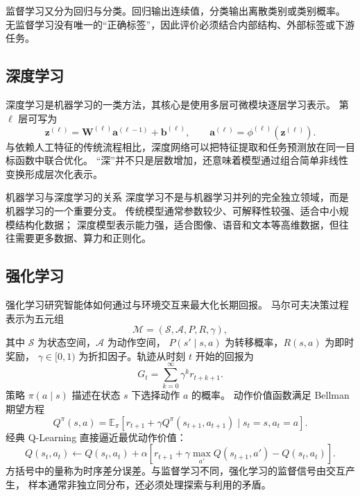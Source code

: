 \documentclass[UTF8,zihao=-4,a4paper,fontset=windows]{ctexart}
\newcommand{\E}{\mathbb{E}}
\begin{document}
监督学习又分为回归与分类。回归输出连续值，分类输出离散类别或类别概率。
无监督学习没有唯一的“正确标签”，因此评价必须结合内部结构、外部标签或下游任务。

\subsection{深度学习}

深度学习是机器学习的一类方法，其核心是使用多层可微模块逐层学习表示\cite{goodfellow}。
第 $\ell$ 层可写为
\begin{equation}
  \bm{z}^{(\ell)}
  =\bm{W}^{(\ell)}\bm{a}^{(\ell-1)}+\bm{b}^{(\ell)},
  \qquad
  \bm{a}^{(\ell)}=\phi^{(\ell)}\!\left(\bm{z}^{(\ell)}\right).
  \label{eq:layer}
\end{equation}
与依赖人工特征的传统流程相比，深度网络可以把特征提取和任务预测放在同一目标函数中联合优化。
“深”并不只是层数增加，还意味着模型通过组合简单非线性变换形成层次化表示。

\begin{notebox}{机器学习与深度学习的关系}
深度学习不是与机器学习并列的完全独立领域，而是机器学习的一个重要分支。
传统模型通常参数较少、可解释性较强、适合中小规模结构化数据；
深度模型表示能力强，适合图像、语音和文本等高维数据，但往往需要更多数据、算力和正则化。
\end{notebox}

\subsection{强化学习}

强化学习研究智能体如何通过与环境交互来最大化长期回报\cite{sutton}。
马尔可夫决策过程表示为五元组
\begin{equation}
  \mathcal{M}=(\mathcal{S},\mathcal{A},P,R,\gamma),
\end{equation}
其中 $\mathcal{S}$ 为状态空间，$\mathcal{A}$ 为动作空间，
$P(s'\mid s,a)$ 为转移概率，$R(s,a)$ 为即时奖励，
$\gamma\in[0,1)$ 为折扣因子。轨迹从时刻 $t$ 开始的回报为
\begin{equation}
  G_t=\sum_{k=0}^{\infty}\gamma^k r_{t+k+1}.
\end{equation}
策略 $\pi(a\mid s)$ 描述在状态 $s$ 下选择动作 $a$ 的概率。
动作价值函数满足 Bellman 期望方程
\begin{equation}
  Q^\pi(s,a)
  =\E_\pi\!\left[
  r_{t+1}+\gamma Q^\pi(s_{t+1},a_{t+1})
  \mid s_t=s,a_t=a
  \right].
\end{equation}
经典 Q-Learning 直接逼近最优动作价值：
\begin{equation}
  Q(s_t,a_t)\leftarrow Q(s_t,a_t)
  +\alpha\left[
  r_{t+1}+\gamma\max_{a'}Q(s_{t+1},a')
  -Q(s_t,a_t)
  \right].
\end{equation}
方括号中的量称为时序差分误差。与监督学习不同，强化学习的监督信号由交互产生，
样本通常非独立同分布，还必须处理探索与利用的矛盾。
\end{document}
